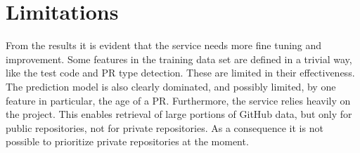 \section{Limitations}
\label{sec:limitations}

From the results it is evident that the service needs more fine tuning and improvement.
Some features in the training data set are defined in a trivial way, like the test code and PR type detection.
These are limited in their effectiveness.
The prediction model is also clearly dominated, and possibly limited, by one feature in particular, the age of a PR.
Furthermore, the service relies heavily on the \ghtorrent project.
This enables retrieval of large portions of GitHub data, but only for public repositories, not for private repositories.
As a consequence it is not possible to prioritize private repositories at the moment.
